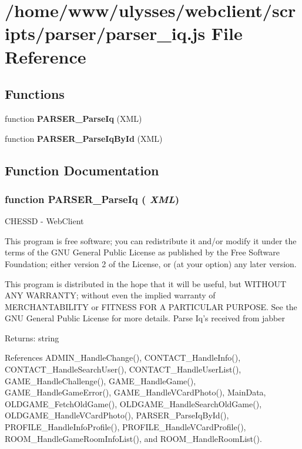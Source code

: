 \section{/home/www/ulysses/webclient/scripts/parser/parser\_\-iq.js File Reference}
\label{parser__iq_8js}
\subsection*{Functions}
\begin{CompactItemize}
\item 
function {\bf PARSER\_\-ParseIq} (XML)
\item 
function {\bf PARSER\_\-ParseIqById} (XML)
\end{CompactItemize}


\subsection{Function Documentation}
\subsubsection{\setlength{\rightskip}{0pt plus 5cm}function PARSER\_\-ParseIq ( {\em XML})}\label{parser__iq_8js_3a156ad4fae8f7ebe3f282b4c8d2ba01}


CHESSD - WebClient

This program is free software; you can redistribute it and/or modify it under the terms of the GNU General Public License as published by the Free Software Foundation; either version 2 of the License, or (at your option) any later version.

This program is distributed in the hope that it will be useful, but WITHOUT ANY WARRANTY; without even the implied warranty of MERCHANTABILITY or FITNESS FOR A PARTICULAR PURPOSE. See the GNU General Public License for more details. Parse Iq's received from jabber

\begin{Desc}
\item[Returns:]string \end{Desc}


References ADMIN\_\-HandleChange(), CONTACT\_\-HandleInfo(), CONTACT\_\-HandleSearchUser(), CONTACT\_\-HandleUserList(), GAME\_\-HandleChallenge(), GAME\_\-HandleGame(), GAME\_\-HandleGameError(), GAME\_\-HandleVCardPhoto(), MainData, OLDGAME\_\-FetchOldGame(), OLDGAME\_\-HandleSearchOldGame(), OLDGAME\_\-HandleVCardPhoto(), PARSER\_\-ParseIqById(), PROFILE\_\-HandleInfoProfile(), PROFILE\_\-HandleVCardProfile(), ROOM\_\-HandleGameRoomInfoList(), and ROOM\_\-HandleRoomList().


